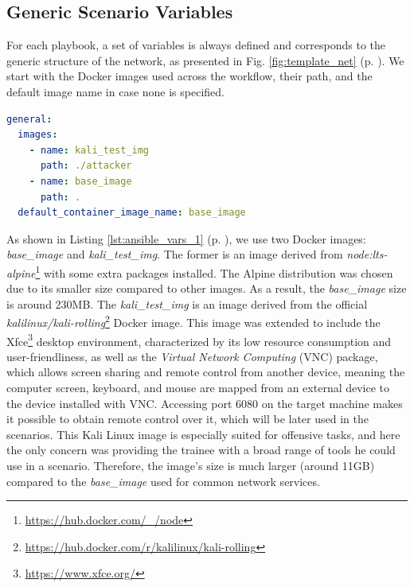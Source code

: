 \subsection{Generic Scenario Variables} \label{sec:generic_scenario_variables}

For each playbook, a set of variables is always defined and corresponds to the generic structure of the network, as presented in Fig. \ref{fig:template_net} (p. \pageref{fig:template_net}). We start with the Docker images used across the workflow, their path, and the default image name in case none is specified.

\begin{lstlisting}[language=yaml,caption=Ansible Variables - Docker Images.,numbers=none,label={lst:ansible_vars_1}]
general:
  images:
    - name: kali_test_img
      path: ./attacker
    - name: base_image
      path: .
  default_container_image_name: base_image
\end{lstlisting}

As shown in Listing \ref{lst:ansible_vars_1} (p. \pageref{lst:ansible_vars_1}), we use two Docker images: \textit{base\_image} and \textit{kali\_test\_img}. The former is an image derived from \textit{node:lts-alpine}\footnote{\url{https://hub.docker.com/_/node}} with some extra packages installed. The Alpine distribution was chosen due to its smaller size compared to other images. As a result, the \textit{base\_image} size is around 230MB. The \textit{kali\_test\_img} is an image derived from the official \textit{kalilinux/kali-rolling}\footnote{\url{https://hub.docker.com/r/kalilinux/kali-rolling}} Docker image. This image was extended to include the Xfce\footnote{\url{https://www.xfce.org/}} desktop environment, characterized by its low resource consumption and user-friendliness, as well as the \textit{Virtual Network Computing} (VNC) package, which allows screen sharing and remote control from another device, meaning the computer screen, keyboard, and mouse are mapped from an external device to the device installed with VNC. Accessing port 6080 on the target machine makes it possible to obtain remote control over it, which will be later used in the scenarios. This Kali Linux image is especially suited for offensive tasks, and here the only concern was providing the trainee with a broad range of tools he could use in a scenario. Therefore, the image's size is much larger (around 11GB) compared to the \textit{base\_image} used for common network services.

